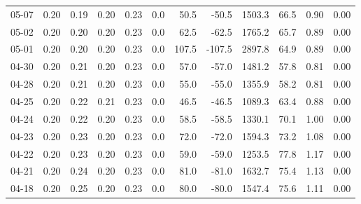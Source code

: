 \begin{threeparttable}
{\begin{tabular}{lrrrrrrrrrrr}
  05-07 &          0.20 &          0.19 &          0.20 &        0.23 &                 0.0 &                50.5 &      -50.5 &              1503.3 &             66.5 &            0.90 &                   0.00 \\
  05-02 &          0.20 &          0.20 &          0.20 &        0.23 &                 0.0 &                62.5 &      -62.5 &              1765.2 &             65.7 &            0.89 &                   0.00 \\
  05-01 &          0.20 &          0.20 &          0.20 &        0.23 &                 0.0 &               107.5 &     -107.5 &              2897.8 &             64.9 &            0.89 &                   0.00 \\
  04-30 &          0.20 &          0.21 &          0.20 &        0.23 &                 0.0 &                57.0 &      -57.0 &              1481.2 &             57.8 &            0.81 &                   0.00 \\
  04-28 &          0.20 &          0.21 &          0.20 &        0.23 &                 0.0 &                55.0 &      -55.0 &              1355.9 &             58.2 &            0.81 &                   0.00 \\
  04-25 &          0.20 &          0.22 &          0.21 &        0.23 &                 0.0 &                46.5 &      -46.5 &              1089.3 &             63.4 &            0.88 &                   0.00 \\
  04-24 &          0.20 &          0.22 &          0.20 &        0.23 &                 0.0 &                58.5 &      -58.5 &              1330.1 &             70.1 &            1.00 &                   0.00 \\
  04-23 &          0.20 &          0.23 &          0.20 &        0.23 &                 0.0 &                72.0 &      -72.0 &              1594.3 &             73.2 &            1.08 &                   0.00 \\
  04-22 &          0.20 &          0.23 &          0.20 &        0.23 &                 0.0 &                59.0 &      -59.0 &              1253.5 &             77.8 &            1.17 &                   0.00 \\
  04-21 &          0.20 &          0.24 &          0.20 &        0.23 &                 0.0 &                81.0 &      -81.0 &              1632.7 &             75.4 &            1.13 &                   0.00 \\
  04-18 &          0.20 &          0.25 &          0.20 &        0.23 &                 0.0 &                80.0 &      -80.0 &              1547.4 &             75.6 &            1.11 &                   0.00 \\

\end{tabular}}
\end{threeparttable}
